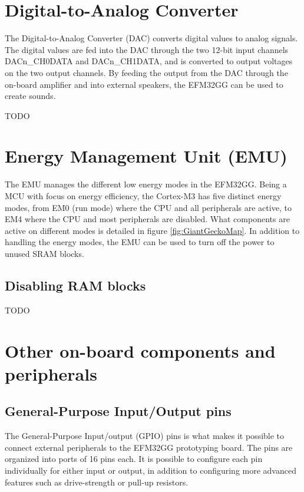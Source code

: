 \section{Digital-to-Analog Converter}

The Digital-to-Analog Converter (DAC) converts digital values to analog signals. The digital values are fed into the DAC through the two 12-bit input channels DACn\_CH0DATA and DACn\_CH1DATA, and is converted to output voltages on the two output channels. By feeding the output from the DAC through the on-board amplifier and into external speakers, the EFM32GG can be used to create sounds.

TODO %


\section{Energy Management Unit (EMU)}\label{sec:emu}
The EMU manages the different low energy modes in the EFM32GG. Being a MCU with focus on energy efficiency, the Cortex-M3 has five distinct energy modes, from EM0 (run mode) where the CPU and all peripherals are active, to EM4 where the CPU and most peripherals are disabled. What components are active on different modes is detailed in figure \ref{fig:GiantGeckoMap}. In addition to handling the energy modes, the EMU can be used to turn off the power to unused SRAM blocks.\cite{efm32gg-rm}


\subsection{Disabling RAM blocks}
TODO %


\section{Other on-board components and peripherals}

\subsection{General-Purpose Input/Output pins}
The General-Purpose Input/output (GPIO) pins is what makes it possible to connect external peripherals to the EFM32GG prototyping board. The pins are organized into ports of 16 pins each. It is possible to configure each pin individually for either input or output, in addition to configuring more advanced features such as drive-strength or pull-up resistors.


